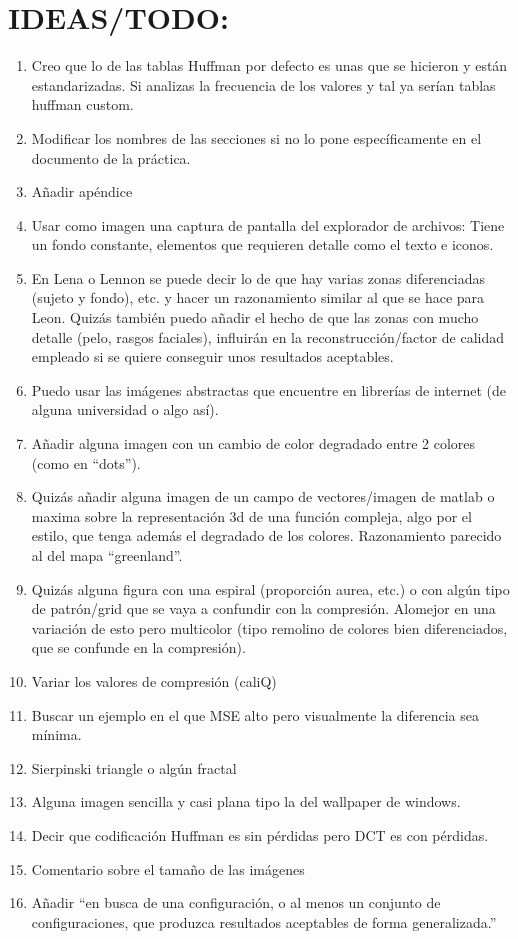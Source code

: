 \documentclass[12pt,a4paper]{article}
\begin{document}
\section*{IDEAS/TODO:}
\begin{enumerate}
    \item Creo que lo de las tablas Huffman por defecto es unas que se hicieron y están estandarizadas. Si analizas la frecuencia de los valores y tal ya serían tablas huffman custom.
    \item Modificar los nombres de las secciones si no lo pone específicamente en el documento de la práctica.
    \item Añadir apéndice
    \item Usar como imagen una captura de pantalla del explorador de archivos: Tiene un fondo constante, elementos que requieren detalle como el texto e iconos.
    \item En Lena o Lennon se puede decir lo de que hay varias zonas diferenciadas (sujeto y fondo), etc. y hacer un razonamiento similar al que se hace para Leon. Quizás también puedo añadir el hecho de que las zonas con mucho detalle (pelo, rasgos faciales), influirán en la reconstrucción/factor de calidad empleado si se quiere conseguir unos resultados aceptables. 
    \item Puedo usar las imágenes abstractas que encuentre en librerías de internet (de alguna universidad o algo así).
    \item Añadir alguna imagen con un cambio de color degradado entre 2 colores (como en ``dots'').
    \item Quizás añadir alguna imagen de un campo de vectores/imagen de matlab o maxima sobre la representación 3d de una función compleja, algo por el estilo, que tenga además el degradado de los colores. Razonamiento parecido al del mapa ``greenland''.
    \item Quizás alguna figura con una espiral (proporción aurea, etc.) o con algún tipo de patrón/grid que se vaya a confundir con la compresión. Alomejor en una variación de esto pero multicolor (tipo remolino de colores bien diferenciados, que se confunde en la compresión).
    \item Variar los valores de compresión (caliQ)
    \item Buscar un ejemplo en el que MSE alto pero visualmente la diferencia sea mínima.
    \item Sierpinski triangle o algún fractal
    \item Alguna imagen sencilla y casi plana tipo la del wallpaper de windows.
    \item Decir que codificación Huffman es sin pérdidas pero DCT es con pérdidas.
    \item Comentario sobre el tamaño de las imágenes
    \item Añadir ``en busca de una configuración, o al menos un conjunto de configuraciones, que produzca resultados aceptables de forma generalizada.''
\end{enumerate}


\newpage
\nocite{*}
\printbibliography
\end{document}
